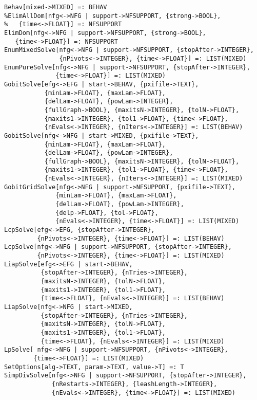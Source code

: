 \begin{verbatim}
Behav[mixed->MIXED] =: BEHAV
%ElimAllDom[nfg<->NFG | support->NFSUPPORT, {strong->BOOL}, 
%   {time<->FLOAT}] =: NFSUPPORT 
ElimDom[nfg<->NFG | support->NFSUPPORT, {strong->BOOL}, 
   {time<->FLOAT}] =: NFSUPPORT 
EnumMixedSolve[nfg<->NFG | support->NFSUPPORT, {stopAfter->INTEGER},
               {nPivots<->INTEGER}, {time<->FLOAT}] =: LIST(MIXED)
EnumPureSolve[nfg<->NFG | support->NFSUPPORT, {stopAfter->INTEGER}, 
              {time<->FLOAT}] =: LIST(MIXED) 
GobitSolve[efg<->EFG | start->BEHAV, {pxifile->TEXT},
           {minLam->FLOAT}, {maxLam->FLOAT},
           {delLam->FLOAT}, {powLam->INTEGER},
           {fullGraph->BOOL}, {maxitsN->INTEGER}, {tolN->FLOAT},
           {maxits1->INTEGER}, {tol1->FLOAT}, {time<->FLOAT},
           {nEvals<->INTEGER}, {nIters<->INTEGER}] =: LIST(BEHAV)
GobitSolve[nfg<->NFG | start->MIXED, {pxifile->TEXT},
           {minLam->FLOAT}, {maxLam->FLOAT},
           {delLam->FLOAT}, {powLam->INTEGER},
           {fullGraph->BOOL}, {maxitsN->INTEGER}, {tolN->FLOAT},
           {maxits1->INTEGER}, {tol1->FLOAT}, {time<->FLOAT},
           {nEvals<->INTEGER}, {nIters<->INTEGER}] =: LIST(MIXED)
GobitGridSolve[nfg<->NFG | support->NFSUPPORT, {pxifile->TEXT},
              {minLam->FLOAT}, {maxLam->FLOAT}, 
              {delLam->FLOAT}, {powLam->INTEGER}, 
              {delp->FLOAT}, {tol->FLOAT},
              {nEvals<->INTEGER}, {time<->FLOAT}] =: LIST(MIXED)
LcpSolve[efg<->EFG, {stopAfter->INTEGER},
         {nPivots<->INTEGER}, {time<->FLOAT}] =: LIST(BEHAV)
LcpSolve[nfg<->NFG | support->NFSUPPORT, {stopAfter->INTEGER},
         {nPivots<->INTEGER}, {time<->FLOAT}] =: LIST(MIXED)
LiapSolve[efg<->EFG | start->BEHAV, 
          {stopAfter->INTEGER}, {nTries->INTEGER},
          {maxitsN->INTEGER}, {tolN->FLOAT},
          {maxits1->INTEGER}, {tol1->FLOAT},
          {time<->FLOAT}, {nEvals<->INTEGER}] =: LIST(BEHAV)
LiapSolve[nfg<->NFG | start->MIXED, 
          {stopAfter->INTEGER}, {nTries->INTEGER},
          {maxitsN->INTEGER}, {tolN->FLOAT},
          {maxits1->INTEGER}, {tol1->FLOAT},
          {time<->FLOAT}, {nEvals<->INTEGER}] =: LIST(MIXED)
LpSolve[ nfg<->NFG | support->NFSUPPORT, {nPivots<->INTEGER},
        {time<->FLOAT}] =: LIST(MIXED)
SetOptions[alg->TEXT, param->TEXT, value->T] =: T
SimpDivSolve[nfg<->NFG | support->NFSUPPORT, {stopAfter->INTEGER}, 
             {nRestarts->INTEGER}, {leashLength->INTEGER},
             {nEvals<->INTEGER}, {time<->FLOAT}] =: LIST(MIXED)
\end{verbatim}


